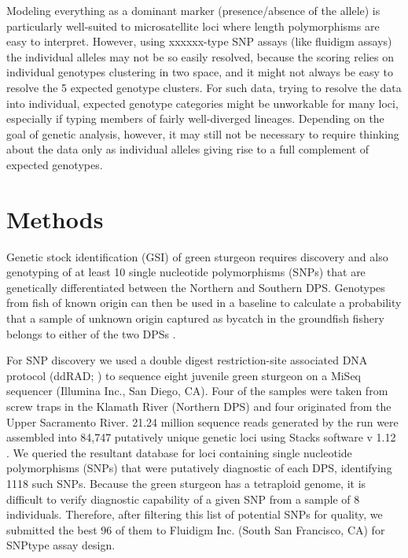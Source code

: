 Modeling everything as a dominant marker (presence/absence of the allele) is particularly
well-suited to microsatellite loci where length polymorphisms are easy to interpret.
However, using xxxxxx-type SNP assays (like fluidigm assays)  the individual alleles
may not be so easily resolved, because the scoring relies on individual genotypes clustering
in two space, and it might not always be easy to resolve the 5 expected genotype clusters.
For such data, trying to resolve the data into individual, expected genotype categories
might be unworkable for many loci, especially if typing members of fairly well-diverged
lineages.  Depending on the goal of genetic analysis, however, it may still not be
necessary to require thinking about the data only as  individual alleles giving rise to
a full complement of expected genotypes.



\section*{Methods}

Genetic stock identification (GSI) of green sturgeon requires discovery and also genotyping of at least 10 single nucleotide polymorphisms (SNPs) that are genetically differentiated between the Northern and Southern DPS. Genotypes from fish of known origin can then be used in a baseline to calculate a probability that a sample of unknown origin captured as bycatch in the groundfish fishery belongs to either of the two DPSs \citep{Andersonetal2008}. 

For SNP discovery we used a double digest restriction-site associated DNA protocol (ddRAD; \citealt{Petersonetal2012}) to sequence eight juvenile green sturgeon on a MiSeq sequencer (Illumina Inc., San Diego, CA). Four of the samples were taken from screw traps in the Klamath River (Northern DPS) and four originated from the Upper Sacramento River. 21.24 million sequence reads generated by the run were assembled into 84,747 putatively unique genetic loci using Stacks software v 1.12 \citep{catchen2011stacks}. We queried the resultant database for loci containing single nucleotide polymorphisms (SNPs) that were putatively diagnostic of each DPS, identifying 1118 such SNPs. Because the green sturgeon has a tetraploid genome, it is difficult to verify diagnostic capability of a given SNP from a sample of 8 individuals. Therefore, after filtering this list of potential SNPs for quality, we submitted the best 96 of them to Fluidigm Inc. (South San Francisco, CA) for SNPtype assay design.

